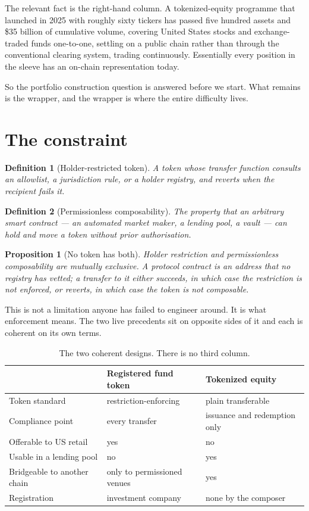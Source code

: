 \documentclass[11pt,a4paper]{article}
\newtheorem{proposition}{Proposition}
\newtheorem{definition}{Definition}
\begin{document}
The relevant fact is the right-hand column. A tokenized-equity programme that
launched in 2025 with roughly sixty tickers has passed five hundred assets and
\$35 billion of cumulative volume, covering United States stocks and exchange-traded
funds one-to-one, settling on a public chain rather than through the conventional
clearing system, trading continuously. Essentially every position in the sleeve
has an on-chain representation today.

So the portfolio construction question is answered before we start. What remains
is the wrapper, and the wrapper is where the entire difficulty lives.

\section{The constraint}

\begin{definition}[Holder-restricted token]
A token whose transfer function consults an allowlist, a jurisdiction rule, or a
holder registry, and reverts when the recipient fails it.
\end{definition}

\begin{definition}[Permissionless composability]
The property that an arbitrary smart contract --- an automated market maker, a
lending pool, a vault --- can hold and move a token without prior authorisation.
\end{definition}

\begin{proposition}[No token has both]
Holder restriction and permissionless composability are mutually exclusive. A
protocol contract is an address that no registry has vetted; a transfer to it
either succeeds, in which case the restriction is not enforced, or reverts, in
which case the token is not composable.
\end{proposition}

This is not a limitation anyone has failed to engineer around. It is what
enforcement means. The two live precedents sit on opposite sides of it and each
is coherent on its own terms.

\begin{table}[h]
\centering
\begin{tabularx}{\textwidth}{lXX}
\toprule
 & Registered fund token & Tokenized equity \\
\midrule
Token standard & restriction-enforcing & plain transferable \\
Compliance point & every transfer & issuance and redemption only \\
Offerable to US retail & yes & no \\
Usable in a lending pool & no & yes \\
Bridgeable to another chain & only to permissioned venues & yes \\
Registration & investment company & none by the composer \\
\bottomrule
\end{tabularx}
\caption{The two coherent designs. There is no third column.}
\end{table}
\end{document}
